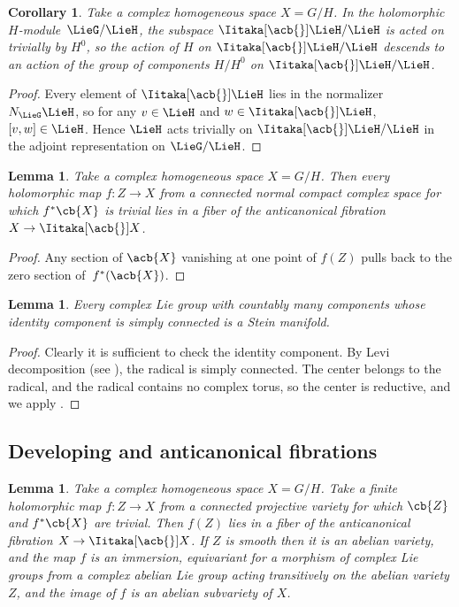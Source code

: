 \documentclass[pdftex]{sigma}
\numberwithin{equation}{section}
\newtheorem{Corollary}[Theorem]{Corollary}
\newtheorem{Lemma}[Theorem]{Lemma}
\newcommand*{\acf}[1]{\Iitaka[\acb{}]{#1}}
\begin{document}
\begin{Corollary}\label{corollary:trivial.conn}
Take a complex homogeneous space $X = G/H$.
In the holomorphic $H$-mod\-ule~$\LieG/\LieH$, the subspace $\acf\LieH/\LieH$ is acted on trivially by $H^0$, so the action
of $H$ on $\acf\LieH/\LieH$ descends to an action of the group of components $H/H^0$ on $\acf\LieH/\LieH$.
\end{Corollary}

\begin{proof}
Every element of $\acf\LieH$ lies in the normalizer $N_{\LieG} \LieH$, so for any $v \in \LieH$ and $w \in
\acf\LieH$, $[v, w] \in \LieH$.
Hence $\LieH$ acts trivially on $\acf\LieH/\LieH$ in the adjoint representation on $\LieG/\LieH$.
\end{proof}

\begin{Lemma}\label{lemma:in.the.fiber}
Take a complex homogeneous space $X = G/H$.
Then every holomorphic map $f \colon Z \to X $ from a connected normal compact complex space for
which $f^*\cb{X}$ is trivial lies in a fiber of the anticanonical fibration $X \to \acf{X}$.
\end{Lemma}

\begin{proof}
Any section of $\acb{X}$ vanishing at one point of $f(Z)$ pulls back to the zero section of~$f^*(\acb{X})$.
\end{proof}

\begin{Lemma}\label{lemma:Stein.G}
Every complex Lie group with countably many components whose identity component is simply connected is a Stein manifold.
\end{Lemma}

\begin{proof}
Clearly it is sufficient to check the identity component.
By Levi decomposition (see \cite[Theorem 16.3.7]{Hilgert.Neeb:2012}), the radical is simply connected.
The center belongs to the radical, and the radical contains no complex torus, so the center is reductive, and we apply
\cite[Theorem 1]{Matsushima/Morimoto:1960}.
\end{proof}

\subsection{Developing and anticanonical fibrations}

\begin{Lemma}\label{lemma:ab.var.in.fiber}
Take a complex homogeneous space $X = G/H$.
Take a finite holomorphic map $f \colon Z\to X$ from a connected projective variety for which $\cb{Z}$ and $f^*\cb{X}$ are trivial.
Then $f(Z)$ lies in a fiber of the anticanonical fibration $X\to \acf{X}$.
If $Z$ is smooth then it is an abelian variety, and the map $f$ is an immersion, equivariant for a morphism of complex Lie groups from a complex abelian Lie group acting transitively on the abelian variety $Z$, and the image of $f$ is an abelian subvariety of $X$.
\end{Lemma}
\end{document}
